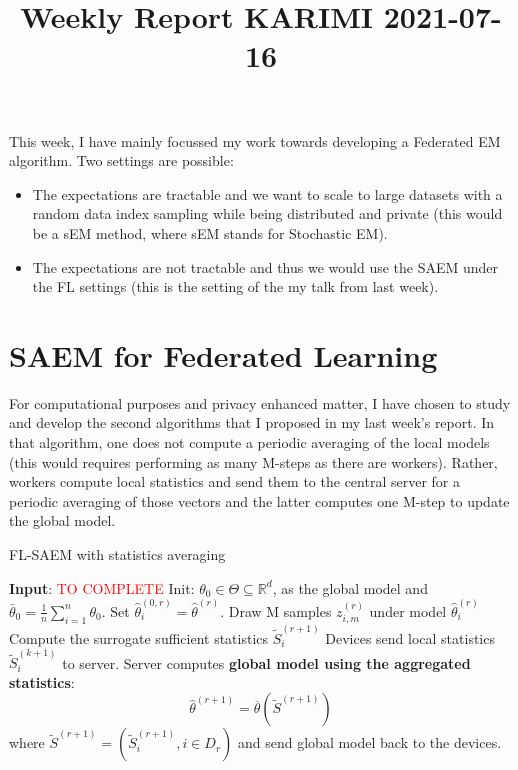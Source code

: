 \documentclass{article}
\begin{document}
\title{Weekly Report KARIMI 2021-07-16}


\date{}
\maketitle

This week, I have mainly focussed my work towards developing a Federated EM algorithm.
Two settings are possible: 
\begin{itemize}
\item The expectations are tractable and we want to scale to large datasets with a random data index sampling while being distributed and private (this would be a sEM method, where sEM stands for Stochastic EM).
\item The expectations are not tractable and thus we would use the SAEM under the FL settings (this is the setting of the my talk from last week).
\end{itemize}

\section{SAEM for Federated Learning}

For computational purposes and privacy enhanced matter, I have chosen to study and develop the second algorithms that I proposed in my last week's report.
In that algorithm, one does not compute a periodic averaging of the local models (this would requires performing as many M-steps as there are workers).
Rather, workers compute local statistics and send them to the central server for a periodic averaging of those vectors and the latter computes one M-step to update the global model.

\begin{algorithm}[H]
\caption{FL-SAEM with statistics averaging} \label{alg:flsaem2}
\begin{algorithmic}[1]
\STATE \textbf{Input}: \textcolor{red}{TO COMPLETE}
\STATE Init: $\theta_{0} \in \Theta \subseteq \mathbb R^d $, as the global model and $\bar{\theta}_0 =  \frac{1}{n} \sum_{i=1}^n \theta_0$.
\STATE Set $\hat{\theta}^{(0,r)}_i = \hat{\theta}^{(r)}$.
\STATE Draw M samples $z_{i,m}^{(r)}$ under model $\hat{\theta}^{(r)}_i$ \label{line:sampling}
\STATE Compute the surrogate sufficient statistics $\tilde{S}_{i}^{(r+1)}$ \label{line:compute}
\STATE Devices send local statistics $\tilde{S}_{i}^{(k+1)}$ to server.
\ENDFOR
\STATE Server computes \textbf{global model using the aggregated statistics}:
$$
\hat{\theta}^{(r+1)} = \overline{\theta}( \tilde{S}^{(r+1)}) 
$$
where $\tilde{S}^{(r+1)} = (\tilde{S}_i^{(r+1)}, i \in D_r)$  and send global model back to the devices. 
\ENDFOR
\end{algorithmic}
\end{algorithm}
\end{document}
